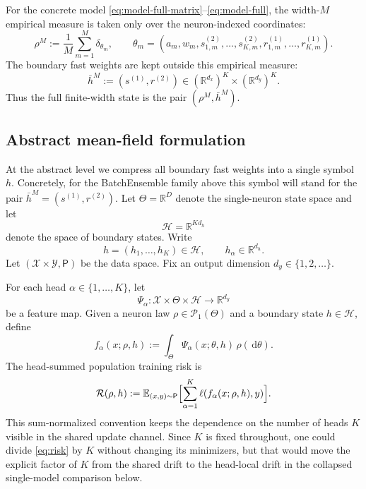 \documentclass[11pt]{article}
\theoremstyle{definition}
\newcommand{\R}{\mathbb{R}}
\newcommand{\E}{\mathbb{E}}
\newcommand{\PP}{\mathcal{P}}
\newcommand{\dd}{\,\mathrm{d}}
\begin{document}
For the concrete model \eqref{eq:model-full-matrix}--\eqref{eq:model-full}, the
width-$M$ empirical measure is taken only over the neuron-indexed coordinates:
\begin{equation}
  \rho^M
  :=
  \frac1M\sum_{m=1}^M \delta_{\theta_m},
  \qquad
  \theta_m=
  (a_m,w_m,s_{1,m}^{(2)},\dots,s_{K,m}^{(2)},r_{1,m}^{(1)},\dots,r_{K,m}^{(1)}).
  \label{eq:empirical}
\end{equation}
The boundary fast weights are kept outside this empirical measure:
\begin{equation}
  \bar h^M := (s^{(1)},r^{(2)}) \in (\R^{d_x})^K\times(\R^{d_y})^K.
  \label{eq:boundary-concrete}
\end{equation}
Thus the full finite-width state is the pair $(\rho^M,\bar h^M)$.

\subsection{Abstract mean-field formulation}

At the abstract level we compress all boundary fast weights into a single symbol
$h$. Concretely, for the BatchEnsemble family above this symbol will stand for
the pair $\bar h^M=(s^{(1)},r^{(2)})$. Let $\Theta=\R^D$ denote the
single-neuron state space and let
\[
  \mathcal H=\R^{K d_h}
\]
denote the space of boundary states. Write
\[
  h=(h_1,\dots,h_K)\in\mathcal H,
  \qquad
  h_\alpha\in\R^{d_h}.
\]
Let $(\mathcal X\times\mathcal Y,\mathsf P)$ be the data space.
Fix an output dimension $d_y\in\{1,2,\dots\}$.

For each head $\alpha\in\{1,\dots,K\}$, let
\[
  \Psi_\alpha:\mathcal X\times\Theta\times\mathcal H\to\R^{d_y}
\]
be a feature map. Given a neuron law $\rho\in\PP_1(\Theta)$ and a boundary state
$h\in\mathcal H$, define
\begin{equation}
  f_\alpha(x;\rho,h)
  :=
  \int_\Theta \Psi_\alpha(x;\theta,h)\,\rho(\dd\theta).
  \label{eq:output}
\end{equation}
The head-summed population training risk is
\begin{equation}
  \mathcal R(\rho,h)
  :=
  \E_{(x,y)\sim\mathsf P}
  \Bigl[
    \sum_{\alpha=1}^K \ell(f_\alpha(x;\rho,h),y)
  \Bigr].
  \label{eq:risk}
\end{equation}
This sum-normalized convention keeps the dependence on the number of heads
$K$ visible in the shared update channel. Since $K$ is fixed throughout, one
could divide \eqref{eq:risk} by $K$ without changing its minimizers, but that
would move the explicit factor of $K$ from the shared drift to the head-local
drift in the collapsed single-model comparison below.
\end{document}
